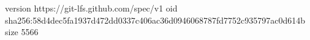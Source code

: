 version https://git-lfs.github.com/spec/v1
oid sha256:58d4dec5fa1937d472dd0337c406ac36d0946068787fd7752c935797ac0d614b
size 5566
